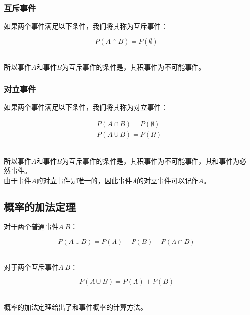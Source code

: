 \documentclass[UTF8]{ctexart}
\begin{document}
\subsubsection{互斥事件}
    如果两个事件满足以下条件，我们将其称为互斥事件：
    \begin{large}
        \begin{equation*}
            P(A\cap B)=P(\emptyset)
        \end{equation*}
    \end{large}\\
    所以事件$A$和事件$B$为互斥事件的条件是，其积事件为不可能事件。\\

\subsubsection{对立事件}
    如果两个事件满足以下条件，我们将其称为对立事件：
    \begin{large}
        \begin{align*}
            &P(A\cap B)=P(\emptyset)\\[3mm]
            &P(A\cup B)=P(\Omega)
        \end{align*}
    \end{large}\\
    所以事件$A$和事件$B$为互斥事件的条件是，其积事件为不可能事件，其和事件为必然事件。\\[3mm]
    由于事件$A$的对立事件是唯一的，因此事件$A$的对立事件可以记作$\bar{A}$。\\

\subsection{概率的加法定理}
    对于两个普通事件$A~B$：
    \begin{large}
        \begin{equation*}
            P(A\cup B)=P(A)+P(B)-P(A\cap B)
        \end{equation*}
    \end{large}\\
    对于两个互斥事件$A~B$：
    \begin{large}
        \begin{equation*}
            P(A\cup B)=P(A)+P(B)
        \end{equation*}
    \end{large}\\
    概率的加法定理给出了和事件概率的计算方法。
\end{document}
